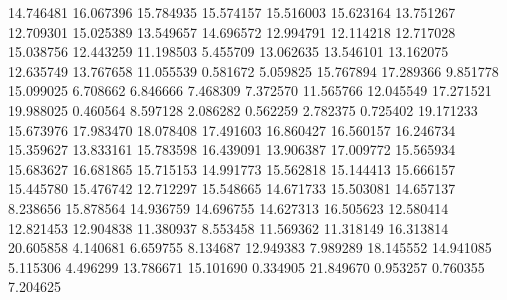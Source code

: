 14.746481
16.067396
15.784935
15.574157
15.516003
15.623164
13.751267
12.709301
15.025389
13.549657
14.696572
12.994791
12.114218
12.717028
15.038756
12.443259
11.198503
5.455709
13.062635
13.546101
13.162075
12.635749
13.767658
11.055539
0.581672
5.059825
15.767894
17.289366
9.851778
15.099025
6.708662
6.846666
7.468309
7.372570
11.565766
12.045549
17.271521
19.988025
0.460564
8.597128
2.086282
0.562259
2.782375
0.725402
19.171233
15.673976
17.983470
18.078408
17.491603
16.860427
16.560157
16.246734
15.359627
13.833161
15.783598
16.439091
13.906387
17.009772
15.565934
15.683627
16.681865
15.715153
14.991773
15.562818
15.144413
15.666157
15.445780
15.476742
12.712297
15.548665
14.671733
15.503081
14.657137
8.238656
15.878564
14.936759
14.696755
14.627313
16.505623
12.580414
12.821453
12.904838
11.380937
8.553458
11.569362
11.318149
16.313814
20.605858
4.140681
6.659755
8.134687
12.949383
7.989289
18.145552
14.941085
5.115306
4.496299
13.786671
15.101690
0.334905
21.849670
0.953257
0.760355
7.204625

